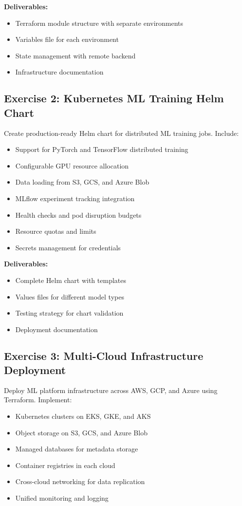 \textbf{Deliverables:}
\begin{itemize}
    \item Terraform module structure with separate environments
    \item Variables file for each environment
    \item State management with remote backend
    \item Infrastructure documentation
\end{itemize}

\subsection{Exercise 2: Kubernetes ML Training Helm Chart}

Create production-ready Helm chart for distributed ML training jobs. Include:

\begin{itemize}
    \item Support for PyTorch and TensorFlow distributed training
    \item Configurable GPU resource allocation
    \item Data loading from S3, GCS, and Azure Blob
    \item MLflow experiment tracking integration
    \item Health checks and pod disruption budgets
    \item Resource quotas and limits
    \item Secrets management for credentials
\end{itemize}

\textbf{Deliverables:}
\begin{itemize}
    \item Complete Helm chart with templates
    \item Values files for different model types
    \item Testing strategy for chart validation
    \item Deployment documentation
\end{itemize}

\subsection{Exercise 3: Multi-Cloud Infrastructure Deployment}

Deploy ML platform infrastructure across AWS, GCP, and Azure using Terraform. Implement:

\begin{itemize}
    \item Kubernetes clusters on EKS, GKE, and AKS
    \item Object storage on S3, GCS, and Azure Blob
    \item Managed databases for metadata storage
    \item Container registries in each cloud
    \item Cross-cloud networking for data replication
    \item Unified monitoring and logging
\end{itemize}

